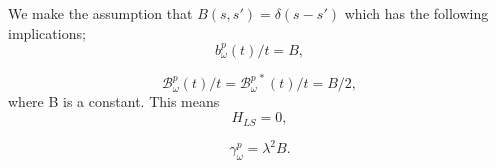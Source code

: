 \documentclass[10pt]{article}
\numberwithin{equation}{section}
\begin{document}
We make the assumption that $B(s,s') = \delta(s-s')$ which has the following implications;
\begin{equation}
b_{\omega}^{p}(t)/t  = B,
\end{equation}

\begin{equation}
\mathcal{B}_{\omega}^{p}(t)/t = \mathcal{B}_{\omega}^{p\:*}(t) /t = B/2,
\end{equation}
where B is a constant. This means
\begin{equation}
H_{LS} = 0,
\end{equation}

\begin{equation}
\gamma_{\omega}^{p}= \lambda^{2}B.
\end{equation}
\end{document}

